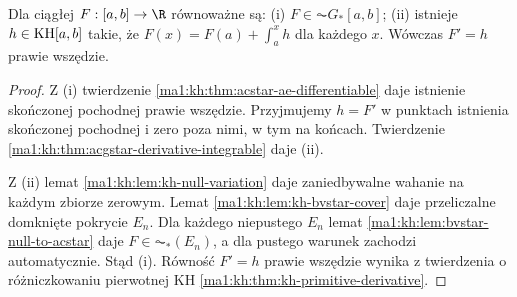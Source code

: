 \begin{twierdzenie}
\label{ma1:kh:thm:kh-acgstar-characterization}\label{it:thm:kh-acgstar-characterization}
Dla ciągłej $F:[a,b]\to\R$ równoważne są: (i) $F\in\AC G_*[a,b]$; (ii) istnieje $h\in\mathrm{KH}[a,b]$ takie, że $F(x)=F(a)+\int_a^x h$ dla każdego $x$. Wówczas $F'=h$ prawie wszędzie.
\end{twierdzenie}
\begin{proof}
Z (i) twierdzenie \ref{ma1:kh:thm:acstar-ae-differentiable} daje istnienie skończonej pochodnej prawie wszędzie. Przyjmujemy $h=F'$ w punktach istnienia skończonej pochodnej i zero poza nimi, w tym na końcach. Twierdzenie \ref{ma1:kh:thm:acgstar-derivative-integrable} daje (ii).

Z (ii) lemat \ref{ma1:kh:lem:kh-null-variation} daje zaniedbywalne wahanie na każdym zbiorze zerowym. Lemat \ref{ma1:kh:lem:kh-bvstar-cover} daje przeliczalne domknięte pokrycie $E_n$. Dla każdego niepustego $E_n$ lemat \ref{ma1:kh:lem:bvstar-null-to-acstar} daje $F\in\AC_*(E_n)$, a dla pustego warunek zachodzi automatycznie. Stąd (i). Równość $F'=h$ prawie wszędzie wynika z twierdzenia o różniczkowaniu pierwotnej KH \ref{ma1:kh:thm:kh-primitive-derivative}.
\end{proof}


